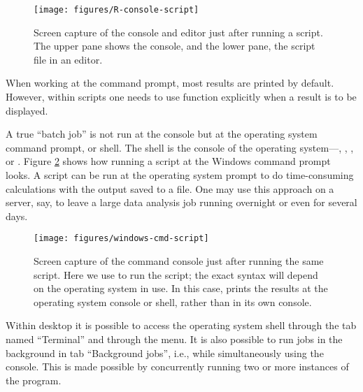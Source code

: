 \documentclass[krantz2]{krantz}\usepackage{knitr}
\begin{document}
\begin{figure}
  \centering
  \texttt{[image: figures/R-console-script]}
  \caption[Script sourced at the R console]{Screen capture of the \Rpgrm console and editor just after running a script. The upper pane shows the \Rpgrm console, and the lower pane, the script file in an editor. }\label{fig:intro:script}
\end{figure}

\begin{warningbox}
When working at the command prompt, most results are printed by default. However, within scripts one needs to use function  explicitly when a result is to be displayed.
\end{warningbox}

A true ``batch job'' is not run at the \Rpgrm console but at the operating system command prompt, or shell. The shell is the console of the operating system---, , , or . Figure \ref{fig:intro:shell} shows how running a script at the Windows command prompt looks. A script can be run at the operating system prompt to do time-consuming calculations with the output saved to a file. One may use this approach on a server, say, to leave a large data analysis job running overnight or even for several days.

\begin{figure}
  \centering
  \texttt{[image: figures/windows-cmd-script]}
  \caption[Script at the Windows cmd promt]{Screen capture of the  command console just after running the same script. Here we use  to run the script; the exact syntax will depend on the operating system in use. In this case, \Rpgrm prints the results at the operating system console or shell, rather than in its own \Rpgrm console.}\label{fig:intro:shell}
\end{figure}

Within \RStudio desktop it is possible to access the operating system shell through the tab named ``Terminal'' and through the menu. It is also possible to run jobs in the background in tab ``Background jobs'', i.e., while simultaneously using the \Rpgrm console. This is made possible by concurrently running two or more instances of the \Rpgrm program.
\end{document}
